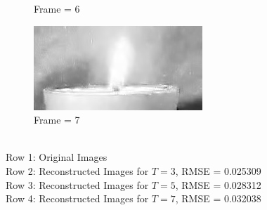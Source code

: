 \documentclass[a4paper, landscape]{article}
\begin{document}
\begin{figure}[H]
\begin{subfigure}{0.13\linewidth}
		\caption{Frame = 6}
	\end{subfigure}
	\begin{subfigure}{0.13\linewidth}
		\centering
		\includegraphics[width=\linewidth]{flame/reconstructed, T = 7, frame = 7.png}
		\caption{Frame = 7}
	\end{subfigure}
	\caption{\\Row 1: Original Images\\Row 2: Reconstructed Images for $T=3$, RMSE = 0.025309\\Row 3: Reconstructed Images for $T=5$, RMSE = 0.028312\\Row 4: Reconstructed Images for $T=7$, RMSE = 0.032038}
	\label{fig:ff}
\end{figure}
\end{document}
